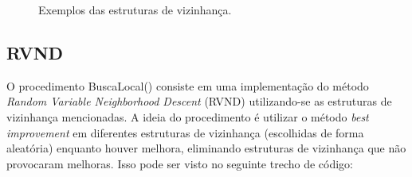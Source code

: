 \begin{figure}[htpb!]
{{
        \label{fig:exemploEstruturaOrOpt2}}}
    \hspace{0.5cm}

    
        \caption{Exemplos das estruturas de vizinhança.}


        \label{fig:estruturasVizinhancaExemplos}

\end{figure}


\subsection{RVND}
O procedimento BuscaLocal() consiste em uma implementação do método \textit{Random Variable Neighborhood Descent} (RVND) utilizando-se as estruturas de vizinhança mencionadas. A ideia do procedimento é utilizar o método \textit{best improvement} em diferentes estruturas de vizinhança (escolhidas de forma aleatória) enquanto houver melhora, eliminando estruturas de vizinhança que não provocaram melhoras. Isso pode ser visto no seguinte trecho de código:

